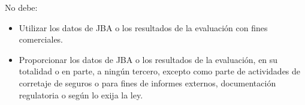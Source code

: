 \documentclass[
]{article}
\begin{document}
\fontsize{11}{13}\selectfont No debe:

\begin{itemize}
  \item Utilizar los datos de JBA o los resultados de la evaluación con fines comerciales.
  \item Proporcionar los datos de JBA o los resultados de la evaluación, en su totalidad o en parte, a ningún tercero, excepto como parte de actividades de corretaje de seguros o para fines de informes externos, documentación regulatoria o según lo exija la ley.
\end{itemize}
\end{document}
